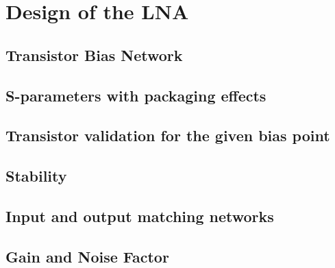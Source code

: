 \section{Design of the LNA}

\subsection{Transistor Bias Network}

\subsection{S-parameters with packaging effects}

\subsection{Transistor validation for the given bias point}

\subsection{Stability}

\subsection{Input and output matching networks}

\subsection{Gain and Noise Factor}
